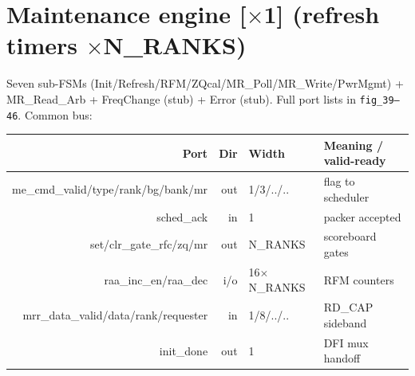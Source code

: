 \documentclass[9pt]{extarticle}
\newcommand{\inst}[1]{\textbf{\textcolor{inst}{[#1]}}}
\newenvironment{ports}{%
  \footnotesize\begin{longtable}{N D W X}\toprule
  \textbf{Port} & \textbf{Dir} & \textbf{Width} & \textbf{Meaning / valid-ready}\\ \midrule\endhead}
  {\bottomrule\end{longtable}}
\begin{document}
\section{Maintenance engine \inst{$\times$1} (refresh timers $\times$N\_RANKS)}
Seven sub-FSMs (Init/Refresh/RFM/ZQcal/MR\_Poll/MR\_Write/PwrMgmt) + MR\_Read\_Arb + FreqChange
(stub) + Error (stub). Full port lists in \texttt{fig\_39--46}. Common bus:
\begin{ports}
me\_cmd\_valid/type/rank/bg/bank/mr & out & 1/3/../.. & flag to scheduler\\
sched\_ack & in & 1 & packer accepted\\
set/clr\_gate\_rfc/zq/mr & out & N\_RANKS & scoreboard gates\\
raa\_inc\_en/raa\_dec & i/o & 16$\times$N\_RANKS & RFM counters\\
mrr\_data\_valid/data/rank/requester & in & 1/8/../.. & RD\_CAP sideband\\
init\_done & out & 1 & DFI mux handoff\\
\end{ports}
\end{document}
